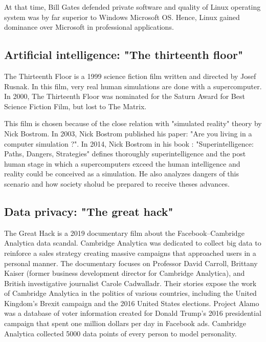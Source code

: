  At that time,  Bill Gates defended private software and quality of Linux operating system 
 was by far superior to Windows Microsoft OS. Hence, Linux gained dominance over Microsoft in professional 
 applications.  
 
 
  
  
     
\subsection*{Artificial intelligence: "The thirteenth floor"} 
 The Thirteenth Floor is a 1999 science fiction film written and directed by Josef Rusnak. 
 In this film, very real human simulations are done with a supercomputer. 
 In 2000, The Thirteenth Floor was nominated for the Saturn Award for Best Science Fiction Film, but lost to The Matrix.
 
 This film is chosen because of the close relation with  "simulated reality" theory by Nick Bostrom.
 In 2003, Nick Bostrom published his paper: "Are you living in a computer simulation ?".
 In 2014, Nick Bostrom in his book : "Superintelligence: Paths, Dangers, Strategies" 
 defines thoroughly superintelligence and the post human stage in which a supercomputers exceed the human intelligence and reality could be 
 conceived as a simulation. He also analyzes dangers of this scenario and 
 how society sholud be prepared to receive theses advances. 
 
 
 
   
    
  
\newpage    
\subsection*{Data privacy: "The great hack"}
 The Great Hack is a 2019 documentary film about the Facebook–Cambridge Analytica data scandal.
 Cambridge Analytica was dedicated to collect big data to reinforce a  sales strategy creating massive campaigns that approached users in a 
 personal manner.
 The documentary focuses on Professor David Carroll, Brittany Kaiser (former business development director for Cambridge Analytica), and 
 British investigative journalist Carole Cadwalladr. Their stories expose the work of Cambridge Analytica in the politics of various 
 countries, including the United Kingdom's Brexit campaign and the 2016 United States elections.   
 Project Alamo was a database of voter information created for Donald Trump's 2016 presidential campaign
 that spent one million dollars per day in Facebook ads. 
 Cambridge Analytica collected 5000 data points of every person to model personality.   
  
